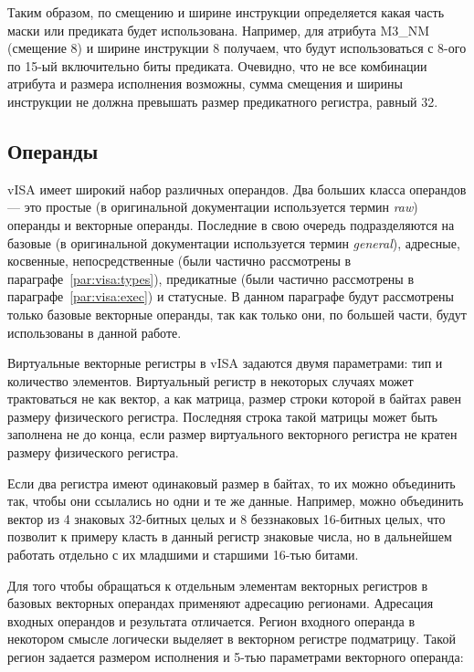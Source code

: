 Таким образом, по смещению и ширине инструкции определяется какая часть маски или предиката будет использована.
Например, для атрибута M3\_NM (смещение 8) и ширине инструкции 8 получаем, что будут использоваться с 8-ого по 15-ый включительно биты предиката.
Очевидно, что не все комбинации атрибута и размера исполнения возможны, сумма смещения и ширины инструкции не должна превышать размер предикатного регистра, равный 32.


\subsection{Операнды}

vISA имеет широкий набор различных операндов.
Два больших класса операндов --- это простые (в оригинальной документации используется термин \textit{raw}) операнды и векторные операнды.
Последние в свою очередь подразделяются на базовые (в оригинальной документации используется термин \textit{general}), адресные, косвенные, непосредственные (были частично рассмотрены в параграфе~\ref{par:visa:types}), предикатные (были частично рассмотрены в параграфе~\ref{par:visa:exec}) и статусные.
В данном параграфе будут рассмотрены только базовые векторные операнды, так как только они, по большей части, будут использованы в данной работе.

Виртуальные векторные регистры в vISA задаются двумя параметрами: тип и количество элементов.
Виртуальный регистр в некоторых случаях может трактоваться не как вектор, а как матрица, размер строки которой в байтах равен размеру физического регистра.
Последняя строка такой матрицы может быть заполнена не до конца, если размер виртуального векторного регистра не кратен размеру физического регистра.

Если два регистра имеют одинаковый размер в байтах, то их можно объединить так, чтобы они ссылались но одни и те же данные.
Например, можно объединить вектор из 4 знаковых 32-битных целых и 8 беззнаковых 16-битных целых, что позволит к примеру класть в данный регистр знаковые числа, но в дальнейшем работать отдельно с их младшими и старшими 16-тью битами.

Для того чтобы обращаться к отдельным элементам векторных регистров в базовых векторных операндах применяют адресацию регионами.
Адресация входных операндов и результата отличается.
Регион входного операнда в некотором смысле логически выделяет в векторном регистре подматрицу.
Такой регион задается размером исполнения и 5-тью параметрами векторного операнда:

